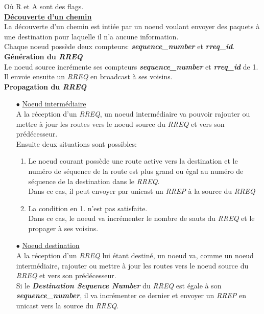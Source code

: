 \documentclass[a4paper, 12pt]{report}
\begin{document}
        Où R et A sont des flags.\\

        \underline{\textbf{Découverte d'un chemin}}\\
        La découverte d'un chemin est intiée par un noeud voulant envoyer des paquets à une destination pour laquelle il n'a aucune information.\\
        Chaque noeud possède deux compteurs: \textbf{\textit{sequence\_number}} et \textbf{\textit{rreq\_id}}.\\
        
        \textbf{Génération du \textit{RREQ}}\\
            Le noeud source incrémente ses compteurs \textbf{\textit{sequence\_number}} et \textbf{\textit{rreq\_id}} de 1.
            Il envoie ensuite un \textit{RREQ} en broadcast à ses voisins.\\
        
            \textbf{Propagation du \textit{RREQ}}\\
        \begin{itemize}
            \item[$\bullet$] \underline{Noeud intermédiaire}\\
                A la réception d'un \textit{RREQ}, un noeud intermédiaire va pouvoir rajouter ou mettre à jour
                les routes vers le noeud source du \textit{RREQ} et vers son prédécesseur.\\
                Ensuite deux situations sont possibles:
                \begin{enumerate}
                    \item Le noeud courant possède une route active vers la destination et le numéro de séquence de la route est plus grand 
                        ou égal au numéro de séquence de la destination dans le \textit{RREQ}.\\
                        Dans ce cas, il peut envoyer par unicast un \textit{RREP} à la source du \textit{RREQ}
                    \item La condition en 1. n'est pas satisfaite.\\
                        Dans ce cas, le noeud va incrémenter le nombre de sauts du \textit{RREQ} et le propager à ses voisins.\\
                \end{enumerate}
                

            \item[$\bullet$] \underline{Noeud destination}\\
                A la réception d'un \textit{RREQ} lui étant destiné, un noeud va, comme un noeud intermédiaire, 
                rajouter ou mettre à jour les routes vers le noeud source du \textit{RREQ} et vers son prédécesseur.\\
                Si le \textbf{\textit{Destination Sequence Number}} du \textit{RREQ} est égale à son \textbf{\textit{sequence\_number}},
                il va incrémenter ce dernier et envoyer un \textit{RREP} en unicast vers la source du \textit{RREQ}.\\
             
        \end{itemize}
\end{document}
